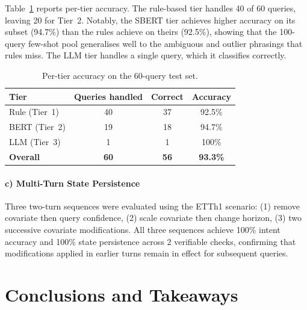 \documentclass[conference]{IEEEtran}
\begin{document}
Table~\ref{tab:ext2_tiers} reports per-tier accuracy. The rule-based tier handles 40 of 60 queries, leaving 20 for Tier~2. Notably, the SBERT tier achieves higher accuracy on its subset (94.7\%) than the rules achieve on theirs (92.5\%), showing that the 100-query few-shot pool generalises well to the ambiguous and outlier phrasings that rules miss. The LLM tier handles a single query, which it classifies correctly.

\begin{table}[h]
\centering
\caption{Per-tier accuracy on the 60-query test set.}
\label{tab:ext2_tiers}
\begin{tabular}{lccc}
\toprule
Tier & Queries handled & Correct & Accuracy \\
\midrule
Rule (Tier~1) & 40 & 37 & 92.5\% \\
BERT (Tier~2) & 19 & 18 & 94.7\% \\
LLM  (Tier~3) &  1 &  1 & 100\%  \\
\midrule
\textbf{Overall} & \textbf{60} & \textbf{56} & \textbf{93.3\%} \\
\bottomrule
\end{tabular}
\end{table}

\paragraph*{c) Multi-Turn State Persistence}

Three two-turn sequences were evaluated using the ETTh1 scenario: (1) remove covariate then query confidence, (2) scale covariate then change horizon, (3) two successive covariate modifications. All three sequences achieve 100\% intent accuracy and 100\% state persistence across 2 verifiable checks, confirming that modifications applied in earlier turns remain in effect for subsequent queries.

\section{Conclusions and Takeaways}
\end{document}
